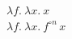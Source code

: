 \documentclass{article}
\begin{document}
\begin{center}
	{\Large
		$\lambda f.\ \lambda x.\ x$\\[0.6em]
		$\lambda f.\ \lambda x.\ f^{\circ n}\, x$
	}
\end{center}
\end{document}
